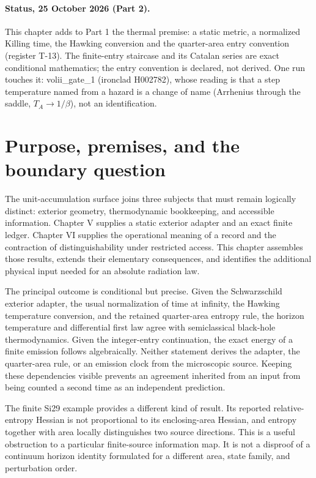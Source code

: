

\paragraph*{Status, 25 October 2026 (Part 2).} This chapter adds to Part 1 the thermal premise: a static metric, a normalized Killing time, the Hawking conversion and the quarter-area entry convention (register T-13). The finite-entry staircase and its Catalan series are exact conditional mathematics; the entry convention is declared, not derived. One run touches it: volii\_gate\_1 (ironclad H002782), whose reading is that a step temperature named from a hazard is a change of name (Arrhenius through the saddle, $T_A\to 1/\beta$), not an identification.


\section{Purpose, premises, and the boundary question}
The unit-accumulation surface joins three subjects that must remain logically distinct: exterior geometry, thermodynamic bookkeeping, and accessible information. Chapter V supplies a static exterior adapter and an exact finite ledger. Chapter VI supplies the operational meaning of a record and the contraction of distinguishability under restricted access. This chapter assembles those results, extends their elementary consequences, and identifies the additional physical input needed for an absolute radiation law.

The principal outcome is conditional but precise. Given the Schwarzschild exterior adapter, the usual normalization of time at infinity, the Hawking temperature conversion, and the retained quarter-area entropy rule, the horizon temperature and differential first law agree with semiclassical black-hole thermodynamics. Given the integer-entry continuation, the exact energy of a finite emission follows algebraically. Neither statement derives the adapter, the quarter-area rule, or an emission clock from the microscopic source. Keeping these dependencies visible prevents an agreement inherited from an input from being counted a second time as an independent prediction.

The finite Si29 example provides a different kind of result. Its reported relative-entropy Hessian is not proportional to its enclosing-area Hessian, and entropy together with area locally distinguishes two source directions. This is a useful obstruction to a particular finite-source information map. It is not a disproof of a continuum horizon identity formulated for a different area, state family, and perturbation order.

